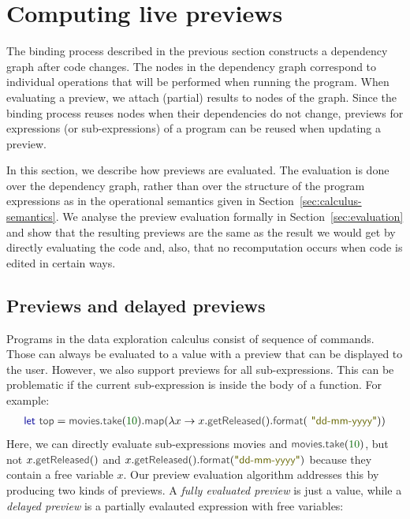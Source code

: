 \documentclass[acmsmall,anonymous,fleqn]{acmart}\settopmatter{printfolios=false,printccs=false,printacmref=false}
\theoremstyle{plain}
\theoremstyle{definition}
\newcommand{\num}[1]{\textcolor{numclr}{#1}}
\newcommand{\str}[1]{\textnormal{\textcolor{strclr}{\sffamily "#1"}}}
\newcommand{\ident}[1]{\textnormal{\textcolor{idclr}{\sffamily #1}}}
\newcommand{\kvd}[1]{\textnormal{\textcolor{kvdclr}{\sffamily #1}}}
\begin{document}

\section{Computing live previews}
\label{sec:previews}

The binding process described in the previous section constructs a dependency graph after code
changes. The nodes in the dependency graph correspond to individual operations that will be performed
when running the program. When evaluating a preview, we attach (partial) results to
nodes of the graph. Since the binding process reuses nodes when their dependencies do not change,
previews for expressions (or sub-expressions) of a program can be reused when updating a preview.

In this section, we describe how previews are evaluated. The evaluation is done over the dependency
graph, rather than over the structure of the program expressions as in the operational semantics
given in Section~\ref{sec:calculus-semantics}. We analyse the preview evaluation formally in
Section~\ref{sec:evaluation} and show that the resulting previews are the same as the result we
would get by directly evaluating the code and, also, that no recomputation occurs when code is
edited in certain ways.


\subsection{Previews and delayed previews}

Programs in the data exploration calculus consist of sequence of commands. Those can always be
evaluated to a value with a preview that can be displayed to the user. However, we also support
previews for all sub-expressions. This can be problematic if the current sub-expression is inside
the body of a function. For example:
%
\begin{equation*}
\begin{array}{l}
\kvd{let}~\ident{top} = \ident{movies}.\ident{take}(\num{10}).\ident{map}(\lambda x \rightarrow x.\ident{getReleased}().\ident{format}(\str{dd-mm-yyyy}))
\end{array}
\end{equation*}
%
Here, we can directly evaluate sub-expressions \ident{movies} and $\ident{movies}.\ident{take}(\num{10})$,
but not $x.\ident{getReleased}()$ and $x.\ident{getReleased}().\ident{format}(\str{dd-mm-yyyy})$
because they contain a free variable $x$. Our preview evaluation algorithm addresses this by
producing two kinds of previews. A \emph{fully evaluated preview} is just a value, while
a \emph{delayed preview} is a partially evalauted expression with free variables:
\end{document}
